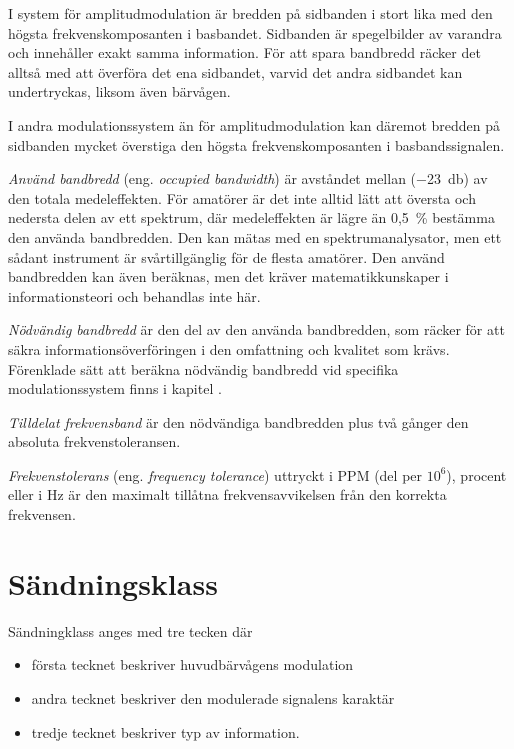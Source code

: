 I system för amplitudmodulation är bredden på sidbanden i stort lika med den
högsta frekvenskomposanten i basbandet.
Sidbanden är spegelbilder av varandra och innehåller exakt samma information.
För att spara bandbredd räcker det alltså med att överföra det ena sidbandet,
varvid det andra sidbandet kan undertryckas, liksom även bärvågen.

I andra modulationssystem än för amplitudmodulation kan däremot bredden på
sidbanden mycket överstiga den högsta frekvenskomposanten i basbandssignalen.

\emph{Använd bandbredd} (eng. \emph{occupied bandwidth}) är avståndet mellan
(\qty{-23}{\decibel}) av den totala medeleffekten.
För amatörer är det inte alltid lätt att översta och nedersta delen av ett
spektrum, där medeleffekten är lägre än 0,5~\% bestämma den använda bandbredden.
Den kan mätas med en spektrumanalysator, men ett sådant instrument är
svårtillgänglig för de flesta amatörer.
Den använd bandbredden kan även beräknas, men det kräver matematikkunskaper i
informationsteori och behandlas inte här.

\emph{Nödvändig bandbredd} är den del av den använda bandbredden, som räcker
för att säkra informationsöverföringen i den omfattning och kvalitet som krävs.
Förenklade sätt att beräkna nödvändig bandbredd vid specifika modulationssystem
finns i kapitel .

\emph{Tilldelat frekvensband} är den nödvändiga bandbredden plus två gånger den
absoluta frekvenstoleransen.

\emph{Frekvenstolerans} (eng. \emph{frequency tolerance}) uttryckt i PPM (del
per \(10^6\)), procent eller i \unit{\hertz} är den maximalt tillåtna
frekvensavvikelsen från den korrekta frekvensen.

\section{Sändningsklass}

Sändningklass anges med tre tecken där

\begin{itemize}
\item första tecknet beskriver huvudbärvågens modulation
\item andra tecknet beskriver den modulerade signalens karaktär
\item tredje tecknet beskriver typ av information.
\end{itemize}

